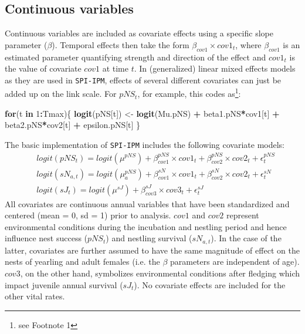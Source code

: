 \documentclass[
]{book}
\newenvironment{Shaded}{\begin{snugshade}}{\end{snugshade}}
\newcommand{\ControlFlowTok}[1]{\textcolor[rgb]{0.13,0.29,0.53}{\textbf{#1}}}
\newcommand{\DecValTok}[1]{\textcolor[rgb]{0.00,0.00,0.81}{#1}}
\newcommand{\KeywordTok}[1]{\textcolor[rgb]{0.13,0.29,0.53}{\textbf{#1}}}
\newcommand{\NormalTok}[1]{#1}
\newcommand{\OperatorTok}[1]{\textcolor[rgb]{0.81,0.36,0.00}{\textbf{#1}}}
\newcommand{\StringTok}[1]{\textcolor[rgb]{0.31,0.60,0.02}{#1}}
\begin{document}
\hypertarget{continuous-variables}{%
\subsection{Continuous variables}\label{continuous-variables}}

Continuous variables are included as covariate effects using a specific slope
parameter (\(\beta\)). Temporal effects then take the form
\(\beta_{cov1}\times cov1_t\), where \(\beta_{cov1}\) is an estimated parameter
quantifying strength and direction of the effect and \(cov1_t\) is the value of
covariate \(cov1\) at time \(t\).
In (generalized) linear mixed effects models as they are used in \texttt{SPI-IPM},
effects of several different covariates can just be added up on the link scale.
For \(pNS_t\), for example, this codes as\footnote{see Footnote 1}:

\begin{Shaded}
\begin{Highlighting}[]
\ControlFlowTok{for}\NormalTok{(t }\ControlFlowTok{in} \DecValTok{1}\OperatorTok{:}\NormalTok{Tmax)\{}
  \KeywordTok{logit}\NormalTok{(pNS[t]) <-}\StringTok{ }\KeywordTok{logit}\NormalTok{(Mu.pNS) }\OperatorTok{+}\StringTok{ }\NormalTok{beta1.pNS}\OperatorTok{*}\NormalTok{cov1[t] }\OperatorTok{+}\StringTok{ }\NormalTok{beta2.pNS}\OperatorTok{*}\NormalTok{cov2[t] }\OperatorTok{+}\StringTok{ }\NormalTok{epsilon.pNS[t]}
\NormalTok{\}}
\end{Highlighting}
\end{Shaded}

The basic implementation of \texttt{SPI-IPM} includes the following covariate models:
\begin{align*}
  & logit(pNS_t) = logit(\mu^{pNS}) + \beta_{cov1}^{pNS}\times cov1_t + \beta_{cov2}^{pNS} \times cov2_t + \epsilon_t^{pNS} \\
  & logit(sN_{a,t}) = logit(\mu_a^{pNS}) + \beta_{cov1}^{sN}\times cov1_t + \beta_{cov2}^{sN} \times cov2_t + \epsilon_t^{sN} \\
  & logit(sJ_t) = logit(\mu^{sJ}) + \beta_{cov3}^{sJ}\times cov3_t + \epsilon_t^{sJ}
\end{align*}
All covariates are continuous annual variables that have been standardized and
centered (mean = 0, sd = 1) prior to analysis.
\(cov1\) and \(cov2\) represent environmental conditions during the incubation and
nestling period and hence influence nest success (\(pNS_t\)) and nestling survival
(\(sN_{a,t}\)). In the case of the latter, covariates are further assumed to have
the same magnitude of effect on the nests of yearling and adult females (i.e.
the \(\beta\) parameters are independent of age). \(cov3\), on the other hand,
symbolizes environmental conditions after fledging which impact juvenile annual
survival (\(sJ_t\)). No covariate effects are included for the other vital rates.
\end{document}
